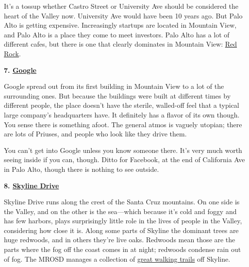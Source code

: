 It's a tossup whether Castro Street or
                    University Ave should be considered the heart of the Valley
                    now. University Ave would have been 10 years ago. But Palo
                    Alto is getting expensive. Increasingly startups are located
                    in Mountain View, and Palo Alto is a place they come to meet
                    investors. Palo Alto has a lot of different cafes, but there
                    is one that clearly dominates in Mountain View:
                    \href{http://maps.google.com/places/us/ca/mountain-view/castro-st/201/-red-rock-coffee}{Red Rock}.

\textbf{7.
                      \href{http://maps.google.com/maps?q=charleston+road+mountain+view}{Google}}

Google spread out from its first building in
                    Mountain View to a lot of the surrounding ones. But because
                    the buildings were built at different times by different
                    people, the place doesn't have the sterile, walled-off feel
                    that a typical large company's headquarters have. It
                    definitely has a flavor of its own though. You sense there
                    is something afoot. The general atmos is vaguely utopian;
                    there are lots of Priuses, and people who look like they
                    drive them.

You can't get into Google unless you
                    know someone there. It's very much worth seeing inside if
                    you can, though. Ditto for Facebook, at the end of
                    California Ave in Palo Alto, though there is nothing to see
                    outside.

\textbf{8.
                      \href{http://maps.google.com/maps?q=skylonda}{Skyline Drive}}

Skyline Drive runs along the crest of the Santa
                    Cruz mountains. On one side is the Valley, and on the other
                    is the sea---which because it's cold and foggy and has
                    few harbors, plays surprisingly little role in the lives of
                    people in the Valley, considering how close it is. Along
                    some parts of Skyline the dominant trees are huge redwoods,
                    and in others they're live oaks. Redwoods mean those are the
                    parts where the fog off the coast comes in at night;
                    redwoods condense rain out of fog. The MROSD manages a
                    collection of
                    \href{http://www.openspace.org/}{great walking trails}
                    off Skyline.

